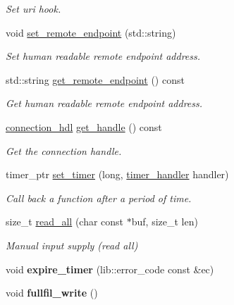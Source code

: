 \begin{DoxyCompactItemize}
\begin{DoxyCompactList}\small\item\em Set uri hook. \end{DoxyCompactList}\item 
void \mbox{\hyperlink{classwebsocketpp_1_1transport_1_1debug_1_1connection_a3c0a3a5bc888a570c287190d299cf276}{set\+\_\+remote\+\_\+endpoint}} (std\+::string)
\begin{DoxyCompactList}\small\item\em Set human readable remote endpoint address. \end{DoxyCompactList}\item 
std\+::string \mbox{\hyperlink{classwebsocketpp_1_1transport_1_1debug_1_1connection_a8e32def2e7de74a13684571cccce494b}{get\+\_\+remote\+\_\+endpoint}} () const
\begin{DoxyCompactList}\small\item\em Get human readable remote endpoint address. \end{DoxyCompactList}\item 
\mbox{\hyperlink{namespacewebsocketpp_a6b3d26a10ee7229b84b776786332631d}{connection\+\_\+hdl}} \mbox{\hyperlink{classwebsocketpp_1_1transport_1_1debug_1_1connection_a258046ad6f04c2fe9d3b31da345c282f}{get\+\_\+handle}} () const
\begin{DoxyCompactList}\small\item\em Get the connection handle. \end{DoxyCompactList}\item 
timer\+\_\+ptr \mbox{\hyperlink{classwebsocketpp_1_1transport_1_1debug_1_1connection_a56b96fed344bafbbb0453997dbf54f40}{set\+\_\+timer}} (long, \mbox{\hyperlink{namespacewebsocketpp_1_1transport_a946cc56ff41139f3002149c15fd87bc9}{timer\+\_\+handler}} handler)
\begin{DoxyCompactList}\small\item\em Call back a function after a period of time. \end{DoxyCompactList}\item 
size\+\_\+t \mbox{\hyperlink{classwebsocketpp_1_1transport_1_1debug_1_1connection_a36a7e0c517495dd8bdbecfa75c5a9d7b}{read\+\_\+all}} (char const $\ast$buf, size\+\_\+t len)
\begin{DoxyCompactList}\small\item\em Manual input supply (read all) \end{DoxyCompactList}\item 
\mbox{\label{classwebsocketpp_1_1transport_1_1debug_1_1connection_a05593a3cbd005194ea0e822631d629ce}} 
void {\bfseries expire\+\_\+timer} (lib\+::error\+\_\+code const \&ec)
\item 
\mbox{\label{classwebsocketpp_1_1transport_1_1debug_1_1connection_a53d8858b47eeccbd9d8bfd8b8e4f4a9a}} 
void {\bfseries fullfil\+\_\+write} ()
\end{DoxyCompactItemize}
